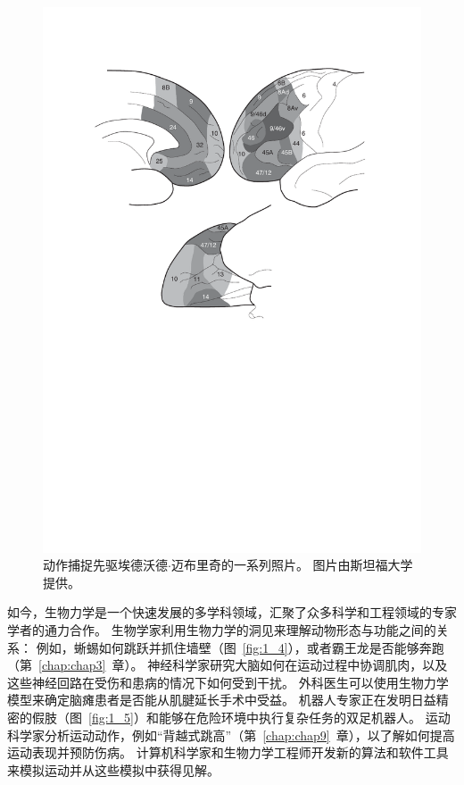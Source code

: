 \begin{figure}[!htb]
	\centering
	\includegraphics[width=1.0\linewidth]{chap1/1_3}
	\caption{动作捕捉先驱埃德沃德$\cdot$迈布里奇的一系列照片。
		图片由斯坦福大学提供。  \label{fig:1_3}}
\end{figure}


如今，生物力学是一个快速发展的多学科领域，汇聚了众多科学和工程领域的专家学者的通力合作。
生物学家利用生物力学的洞见来理解动物形态与功能之间的关系：
例如，蜥蜴如何跳跃并抓住墙壁（图~\ref{fig:1_4}），或者霸王龙是否能够奔跑（第~\ref{chap:chap3}~章）。
神经科学家研究大脑如何在运动过程中协调肌肉，以及这些神经回路在受伤和患病的情况下如何受到干扰。
外科医生可以使用生物力学模型来确定脑瘫患者是否能从肌腱延长手术中受益。
机器人专家正在发明日益精密的假肢（图~\ref{fig:1_5}）和能够在危险环境中执行复杂任务的双足机器人。
运动科学家分析运动动作，例如“背越式跳高”（第~\ref{chap:chap9}~章），以了解如何提高运动表现并预防伤病。
计算机科学家和生物力学工程师开发新的算法和软件工具来模拟运动并从这些模拟中获得见解。


